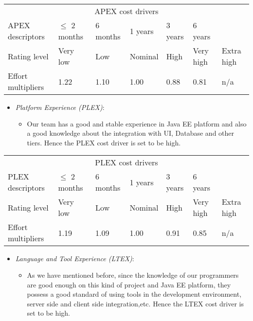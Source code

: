 \begin{table}[H]
	\hspace*{-1.7cm}
	\begin{tabular}{|p{2cm}|p{2.04cm}|p{1.96cm}|p{2cm}|p{2cm}|p{2cm}|p{2cm}|}
		\hline
		\multicolumn{7}{|c|}{APEX cost drivers} \\
		\hhline{|=======|}
		APEX descriptors & \(\leq\) 2 months & 6 months & 1 years & 3 years & 6 years & \\
		\hline
		Rating level & Very low & Low & Nominal & High & Very high & Extra high \\
		\hline
		Effort multipliers & 1.22 & 1.10 & 1.00 & 0.88 & 0.81 & n/a \\
		\hline
	\end{tabular}
\end{table}

\begin{itemize}
	\item \emph{Platform Experience (PLEX)}:
	\begin{itemize}
		\item[] Our team has a good and stable experience in Java EE platform and also a good knowledge about the integration with UI, Database and other tiers. Hence the PLEX cost driver is set to be high.
	\end{itemize}
\end{itemize}

\begin{table}[H]
	\hspace*{-1.7cm}
	\begin{tabular}{|p{2cm}|p{2.04cm}|p{1.96cm}|p{2cm}|p{2cm}|p{2cm}|p{2cm}|}
		\hline
		\multicolumn{7}{|c|}{PLEX cost drivers} \\
		\hhline{|=======|}
		PLEX descriptors & \(\leq\) 2 months & 6 months & 1 years & 3 years & 6 years & \\
		\hline
		Rating level & Very low & Low & Nominal & High & Very high & Extra high \\
		\hline
		Effort multipliers & 1.19 & 1.09 & 1.00 & 0.91 & 0.85 & n/a \\
		\hline
	\end{tabular}
\end{table}

\begin{itemize}
	\item \emph{Language and Tool Experience (LTEX)}:
	\begin{itemize}
		\item[] As we have mentioned before, since the knowledge of our programmers are good enough on this kind of project and Java EE platform, they possess a good standard of using tools in the development environment, server side and client side integration,etc. Hence the LTEX cost driver is set to be high.
	\end{itemize}
\end{itemize}

